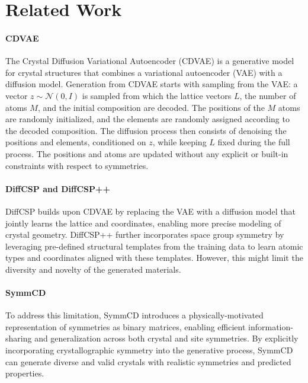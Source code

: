 \section{Related Work}
\paragraph{CDVAE}
The Crystal Diffusion Variational Autoencoder (CDVAE) \citep{xie2022crystal} is a generative model for crystal structures that combines a variational autoencoder (VAE) with a diffusion model. Generation from CDVAE starts with sampling from the VAE: a vector $z\sim\mathcal{N}(0, I)$ is sampled from which the lattice vectors $L$, the number of atoms $M$, and the initial composition are decoded. The positions of the $M$ atoms are randomly initialized, and the elements are randomly assigned according to the decoded composition. The diffusion process then consists of denoising the positions and elements, conditioned on $z$, while keeping $L$ fixed during the full process. The positions and atoms are updated without any explicit or built-in constraints with respect to symmetries. 


\paragraph{DiffCSP and DiffCSP++}
DiffCSP \citep{jiao_crystal_2023} builds upon CDVAE by replacing the VAE with a diffusion model that jointly learns the lattice and coordinates, enabling more precise modeling of crystal geometry. \mbox{DiffCSP++} \cite{jiao_space_2024} further incorporates space group symmetry by leveraging pre-defined structural templates from the training data to learn atomic types and coordinates aligned with these templates. However, this might limit the diversity and novelty of the generated materials.

\paragraph{SymmCD}
To address this limitation, SymmCD \citep{levy_symmcd_2024} introduces a physically-motivated representation of symmetries as binary matrices, enabling efficient information-sharing and generalization across both crystal and site symmetries. By explicitly incorporating crystallographic symmetry into the generative process, SymmCD can generate diverse and valid crystals with realistic symmetries and predicted properties.